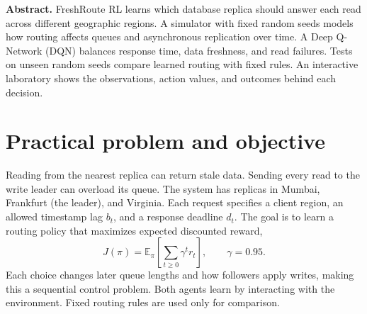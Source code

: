 \documentclass[10pt,a4paper,twocolumn]{article}
\begin{document}

\noindent\textbf{Abstract.}
FreshRoute RL learns which database replica should answer each read across
different geographic regions. A simulator with fixed random seeds models how
routing affects queues and asynchronous replication over time. A Deep
Q-Network (DQN) balances response time, data freshness, and read failures.
Tests on unseen random seeds compare learned routing with fixed rules. An
interactive laboratory shows the observations, action values, and outcomes
behind each decision.

\section{Practical problem and objective}
Reading from the nearest replica can return stale data. Sending every read to
the write leader can overload its queue. The system has replicas in Mumbai,
Frankfurt (the leader), and Virginia. Each request specifies a client region,
an allowed timestamp lag $b_t$, and a response deadline $d_t$. The goal is to
learn a routing policy that maximizes expected discounted reward,
\[
 J(\pi)=\mathbb{E}_{\pi}\!\left[\sum_{t\geq0}\gamma^t r_t\right],
 \qquad \gamma=0.95.
\]
Each choice changes later queue lengths and how followers apply writes, making
this a sequential control problem. Both agents learn by interacting with the
environment. Fixed routing rules are used only for comparison.
\end{document}
